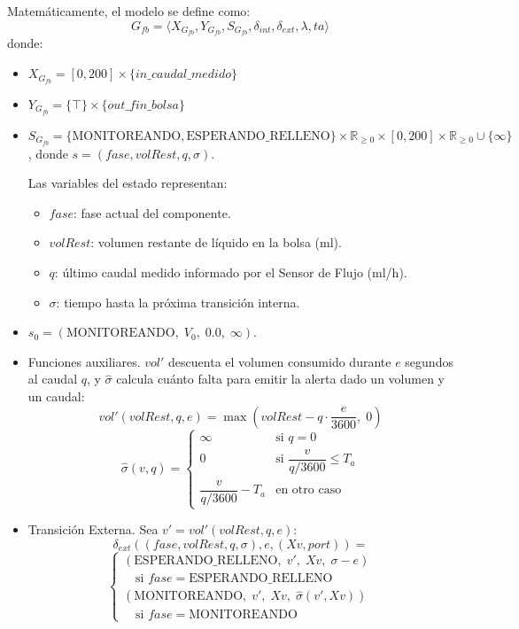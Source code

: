 Matemáticamente, el modelo se define como:
\[ G_{fb} = \langle X_{G_{fb}}, Y_{G_{fb}}, S_{G_{fb}}, \delta_{int}, \delta_{ext}, \lambda, ta \rangle \]
donde:
\begin{itemize}
    \item $X_{G_{fb}} = [0, 200] \times \{in\_caudal\_medido\}$
    \item $Y_{G_{fb}} = \{\top\} \times \{out\_fin\_bolsa\}$
    \item $S_{G_{fb}} = \{\text{MONITOREANDO}, \text{ESPERANDO\_RELLENO}\}
           \times \mathbb{R}_{\geq 0}
           \times [0, 200]
           \times \mathbb{R}_{\geq 0} \cup \{\infty\}$,
           donde $s = (fase, volRest, q, \sigma)$.

    Las variables del estado representan:
    \begin{itemize}
        \item $fase$: fase actual del componente.
        \item $volRest$: volumen restante de líquido en la bolsa (ml).
        \item $q$: último caudal medido informado por el Sensor de Flujo (ml/h).
        \item $\sigma$: tiempo hasta la próxima transición interna.
    \end{itemize}

    \item $s_0 = (\text{MONITOREANDO},\; V_0,\; 0.0,\; \infty)$.

    \item Funciones auxiliares. $vol'$ descuenta el volumen consumido durante $e$ segundos al caudal $q$, y $\hat{\sigma}$ calcula cuánto falta para emitir la alerta dado un volumen y un caudal:
    \[
    vol'(volRest, q, e) = \max\!\left(volRest - q \cdot \frac{e}{3600},\; 0\right)
    \]
    \[
    \hat{\sigma}(v, q) =
    \begin{cases}
    \infty & \text{si } q = 0 \\
    0 & \text{si } \dfrac{v}{q / 3600} \leq T_a \\[1ex]
    \dfrac{v}{q / 3600} - T_a & \text{en otro caso}
    \end{cases}
    \]

    \item Transición Externa. Sea $v' = vol'(volRest, q, e)$:
    \[
    \delta_{ext}((fase, volRest, q, \sigma), e, (Xv, port)) =
    \]
    \[
    \begin{cases}
    (\text{ESPERANDO\_RELLENO},\; v',\; Xv,\; \sigma - e) \\
    \quad \text{si } fase = \text{ESPERANDO\_RELLENO} \\[2ex]
    (\text{MONITOREANDO},\; v',\; Xv,\; \hat{\sigma}(v', Xv)) \\
    \quad \text{si } fase = \text{MONITOREANDO}
    \end{cases}
    \]


\end{itemize}
